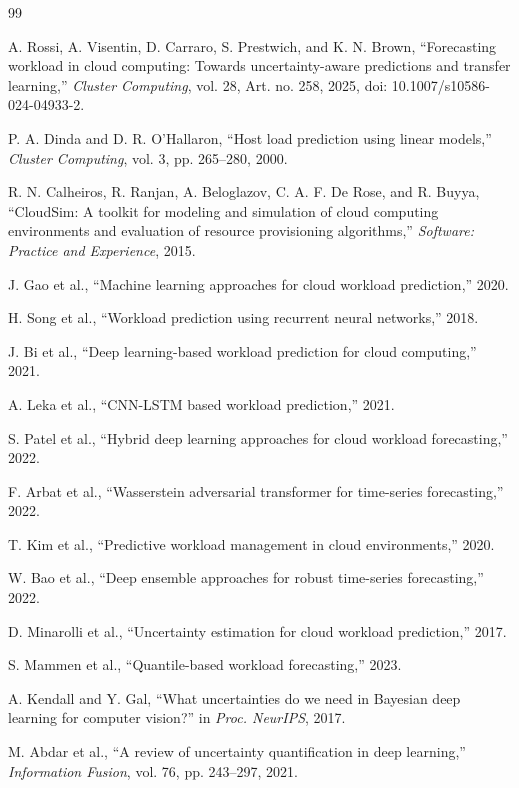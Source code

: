 \documentclass[conference]{IEEEtran}
\begin{document}
\begin{thebibliography}{99}

A. Rossi, A. Visentin, D. Carraro, S. Prestwich, and K. N. Brown,
``Forecasting workload in cloud computing: Towards uncertainty-aware predictions and transfer learning,''
\emph{Cluster Computing}, vol. 28, Art. no. 258, 2025,
doi: 10.1007/s10586-024-04933-2.

P. A. Dinda and D. R. O'Hallaron,
``Host load prediction using linear models,''
\emph{Cluster Computing}, vol. 3, pp. 265--280, 2000.

R. N. Calheiros, R. Ranjan, A. Beloglazov, C. A. F. De Rose, and R. Buyya,
``CloudSim: A toolkit for modeling and simulation of cloud computing environments and evaluation of resource provisioning algorithms,''
\emph{Software: Practice and Experience}, 2015.

J. Gao et al.,
``Machine learning approaches for cloud workload prediction,''
2020.

H. Song et al.,
``Workload prediction using recurrent neural networks,''
2018.

J. Bi et al.,
``Deep learning-based workload prediction for cloud computing,''
2021.

A. Leka et al.,
``CNN-LSTM based workload prediction,''
2021.

S. Patel et al.,
``Hybrid deep learning approaches for cloud workload forecasting,''
2022.

F. Arbat et al.,
``Wasserstein adversarial transformer for time-series forecasting,''
2022.

T. Kim et al.,
``Predictive workload management in cloud environments,''
2020.

W. Bao et al.,
``Deep ensemble approaches for robust time-series forecasting,''
2022.

D. Minarolli et al.,
``Uncertainty estimation for cloud workload prediction,''
2017.

S. Mammen et al.,
``Quantile-based workload forecasting,''
2023.

A. Kendall and Y. Gal,
``What uncertainties do we need in Bayesian deep learning for computer vision?''
in \emph{Proc. NeurIPS}, 2017.

M. Abdar et al.,
``A review of uncertainty quantification in deep learning,''
\emph{Information Fusion}, vol. 76, pp. 243--297, 2021.


\end{thebibliography}
\end{document}
